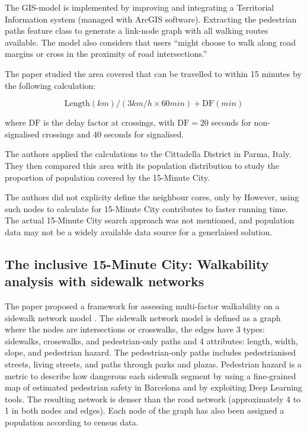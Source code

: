 The GIS-model is implemented by improving and integrating a Territorial Information system (managed with ArcGIS software). Extracting the pedestrian paths feature class to generate a link-node graph with all walking routes available. The model also considers that users ``might choose to walk along road margins or cross in the proximity of road intersections.”

The paper studied the area covered that can be travelled to  within 15 minutes by the following calculation:

$$\text{Length}(km) / (3 km/h \times 60 min) + \text{DF} (min)$$

where $\text{DF}$ is the delay factor at crossings, with $\text{DF}=20$ seconds for non-signalised crossings and 40 seconds for signalised.

The authors applied the calculations to the Cittadella District in Parma, Italy. They then compared this area with its population distribution to study the proportion of population covered by the 15-Minute City.

The authors did not explicity define the neighbour cores, only by  However, using such nodes to calculate for 15-Minute City contributes to faster running time. The actual 15-Minute City search approach was not mentioned, and population data may not be a widely available data source for a generlaised solution.

\subsection{The inclusive 15-Minute City: Walkability analysis with sidewalk networks} \label{rhoads_inclusive_2023}

The paper proposed a framework for assessing multi-factor walkability on a sidewalk network model \cite{rhoads_inclusive_2023}. The sidewalk network model is defined as a graph where the nodes are intersections or crosswalks, the edges have 3 types: sidewalks, crosswalks, and pedestrian-only paths and 4 attributes: length, width, slope, and pedestrian hazard. The pedestrian-only paths includes pedestrianised streets, living streets, and paths through parks and plazas. Pedestrian hazard is a metric to describe how dangerous each sidewalk segment by using a fine-grained map of estimated pedestrian safety in Barcelona \cite{bustos_explainable_2021} and by exploiting Deep Learning tools. The resulting network is denser than the road network (approximately 4 to 1 in both nodes and edges). Each node of the graph has also been assigned a population according to census data.

